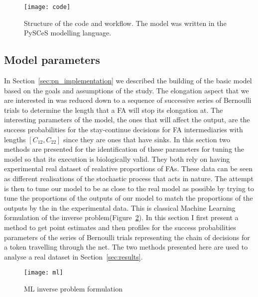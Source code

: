 \begin{figure}[htbp!]
\centering
\texttt{[image: code]}
\caption[Workflow]{Structure of the code and workflow. The model was
  written in the PySCeS modelling language.}
\label{fig:code}
\end{figure}


\subsection{Model parameters}
\label{sec:params}
In Section~\ref{sec:pn_implementation} we described the building of the basic model
based on the goals and assumptions of the study. The elongation aspect
that we are interested in was reduced down to a sequence of successive
series of Bernoulli trials to determine the length that a FA will
stop its elongation at. The interesting parameters of the model, the
ones that will affect the output, are the success probabilities for
the stay-continue decisions for FA intermediaries with lengths
$[C_{12}, C_{22}]$ since they are ones that have sinks. In this
section two methods are presented for the identification of these parameters for
tuning the model so that its execution is biologically valid. They both rely on having experimental real dataset of
realative proportions of FAs. These data can be
seen as different realisations of the stochastic process that acts in nature. The attempt is then to tune our
model to be as close to the real model as possible by trying to tune
the proportions of the outputs of our model to match the proportions
of the outputs by the in the experimental
data. This is  classical Machine Learning formulation of the inverse
problem(Figure~\ref{fig:ml}). In this section I first present a method to get point
estimates and then profiles for the success probabilities parameters of the series of Bernoulli
trials representing the chain of decisions for a token travelling
through the net. The two methods presented here are used to analyse a
real dataset in Section~\ref{sec:results}.

\begin{figure}[htbp!]
\centering
\texttt{[image: ml]}
\caption[ML inverse problem formulation]{ML inverse problem formulation}
\label{fig:ml}
\end{figure}



